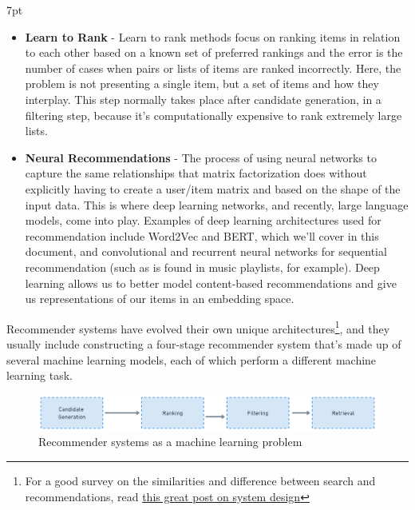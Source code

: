 \documentclass[11pt, table]{diazessay} %
\newenvironment{formal}{%
  \def\FrameCommand{%
	\hspace{1pt}%
	{\color{w_lightblue}\vrule width 2pt}%
	{\color{formalshade}\vrule width 4pt}%
	\colorbox{formalshade}%
  }%
  \MakeFramed{\advance\hsize-\width\FrameRestore}%
  \noindent\hspace{-4.55pt}%
  \begin{adjustwidth}{}{7pt}%
  \vspace{2pt}\vspace{2pt}%
}
{%
  \vspace{2pt}\end{adjustwidth}\endMakeFramed%
}
\begin{document}
\begin{sloppypar}
\begin{formal}
\begin{itemize}
  \item \textbf{Learn to Rank} -  Learn to rank methods focus on ranking items in relation to each other based on a known set of preferred rankings and the error is the number of cases when pairs or lists of items are ranked incorrectly. Here, the problem is not presenting a single item, but a set of items and how they interplay. This step normally takes place after candidate generation, in a filtering step, because it's computationally expensive to rank extremely large lists.
  \item \textbf{Neural Recommendations} - The process of using neural networks to capture the same relationships that matrix factorization does without explicitly having to create a user/item matrix and based on the shape of the input data. This is where deep learning networks, and recently, large language models, come into play. Examples of deep learning architectures used for recommendation include Word2Vec and BERT, which we'll cover in this document, and convolutional and recurrent neural networks for sequential recommendation (such as is found in music playlists, for example). Deep learning allows us to better model content-based recommendations and give us representations of our items in an embedding space. \citep{zhang2019deep}
\end{itemize}
\end{formal}

Recommender systems have evolved  their own unique architectures\footnote{For a good survey on the similarities and difference between search and recommendations, read \href{https://eugeneyan.com/writing/system-design-for-discovery/}{this great post on system design}}, and they usually include constructing a four-stage recommender system that's made up of several machine learning models, each of which perform a different machine learning task.

\begin{figure}[H]
\centering
\includegraphics[width=\textwidth]{figures/recsys.png}
\caption{Recommender systems as a machine learning problem}
\end{figure}


\end{sloppypar}
\end{document}
